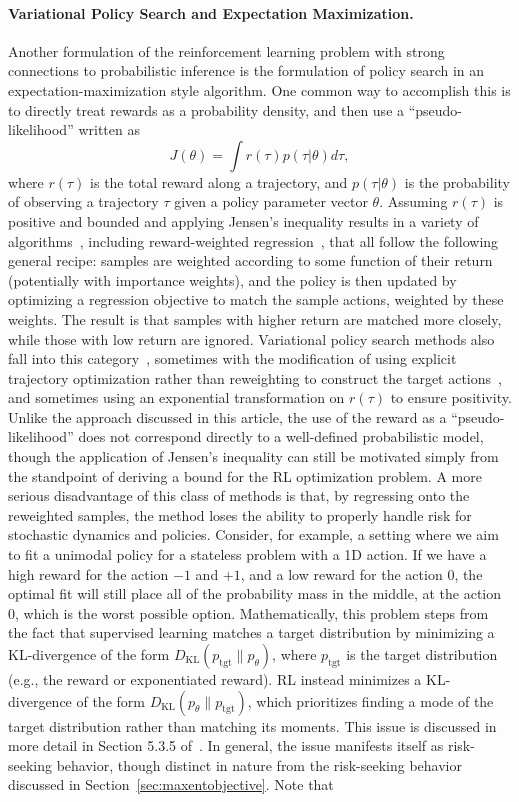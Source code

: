 \paragraph{Variational Policy Search and Expectation Maximization.} Another formulation of the reinforcement learning problem with strong connections to probabilistic inference is the formulation of policy search in an expectation-maximization style algorithm. One common way to accomplish this is to directly treat rewards as a probability density, and then use a ``pseudo-likelihood'' written as
\[
J(\theta) = \int r(\tau) p(\tau | \theta) d\tau,
\]
where $r(\tau)$ is the total reward along a trajectory, and $p(\tau|\theta)$ is the probability of observing a trajectory $\tau$ given a policy parameter vector $\theta$. Assuming $r(\tau)$ is positive and bounded and applying Jensen's inequality results in a variety of algorithms~\citep{rwr,em_policy_search,neumann,mpo}, including reward-weighted regression~\citep{rwr}, that all follow the following general recipe: samples are weighted according to some function of their return (potentially with importance weights), and the policy is then updated by optimizing a regression objective to match the sample actions, weighted by these weights. The result is that samples with higher return are matched more closely, while those with low return are ignored. Variational policy search methods also fall into this category~\citep{neumann,levine_vgps}, sometimes with the modification of using explicit trajectory optimization rather than reweighting to construct the target actions~\citep{levine_vgps}, and sometimes using an exponential transformation on $r(\tau)$ to ensure positivity. Unlike the approach discussed in this article, the use of the reward as a ``pseudo-likelihood'' does not correspond directly to a well-defined probabilistic model, though the application of Jensen's inequality can still be motivated simply from the standpoint of deriving a bound for the RL optimization problem. A more serious disadvantage of this class of methods is that, by regressing onto the reweighted samples, the method loses the ability to properly handle risk for stochastic dynamics and policies. Consider, for example, a setting where we aim to fit a unimodal policy for a stateless problem with a 1D action. If we have a high reward for the action $-1$ and $+1$, and a low reward for the action $0$, the optimal fit will still place all of the probability mass in the middle, at the action $0$, which is the worst possible option. Mathematically, this problem steps from the fact that supervised learning matches a target distribution by minimizing a KL-divergence of the form $D_\text{KL}(p_\text{tgt} \| p_\theta)$, where $p_\text{tgt}$ is the target distribution (e.g., the reward or exponentiated reward). RL instead minimizes a KL-divergence of the form $D_\text{KL}(p_\theta \| p_\text{tgt})$, which prioritizes finding a mode of the target distribution rather than matching its moments. This issue is discussed in more detail in Section 5.3.5 of~\citep{levine_thesis}. In general, the issue manifests itself as risk-seeking behavior, though distinct in nature from the risk-seeking behavior discussed in Section~\ref{sec:maxentobjective}. Note that 